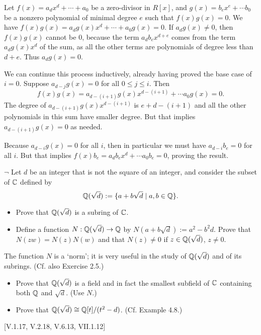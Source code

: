 \begin{solution}
	Let $f(x) = a_d x^d + \cdots + a_0$ be a zero-divisor in $R[x]$, and $g(x) = b_e x^e + \cdots b_0$ be a nonzero polynomial of minimal degree $e$ such that $f(x)g(x) = 0$. We have $f(x)g(x) = a_d g(x) x^d + \cdots + a_0 g(x) = 0$. If $a_d g(x) \neq 0$, then $f(x)g(x)$ cannot be $0$, because the term $a_d b_e x^{d+e}$ comes from the term $a_d g(x) x^d$ of the sum, as all the other terms are polynomials of degree less than $d+e$. Thus $a_d g(x) = 0$. 
	
	We can continue this process inductively, already having proved the base case of $i = 0$. Suppose $a_{d-j} g(x) = 0$ for all $0 \leq j \leq i$. Then
	\[
		f(x)g(x) = a_{d-(i+1)} g(x) x^{d-(i+1)} + \cdots a_0 g(x) = 0 \text{.}
	\]
	The degree of $a_{d-(i+1)} g(x) x^{d-(i+1)}$ is $e + d - (i+1)$ and all the other polynomials in this sum have smaller degree. But that implies $a_{d-(i+1)}g(x) = 0$ as needed.
	
	Because $a_{d-i} g(x) = 0$ for all $i$, then in particular we must have $a_{d-i} b_e = 0$ for all $i$. But that implies $f(x) b_e = a_d b_e x^d + \cdots a_0 b_e = 0$, proving the result.
\end{solution}

\begin{problem}
	$\neg$ Let $d$ be an integer that is not the square of an integer, and consider the subset of $\mathbb{C}$ defined by
	\[
		\mathbb{Q}(\sqrt{d}) := \{ a + b \sqrt{d} \mid a, b \in \mathbb{Q} \} \text{.}
	\]
	\begin{itemize}
		\item Prove that $\mathbb{Q}(\sqrt{d})$ is a subring of $\mathbb{C}$.
		\item Define a function $N: \mathbb{Q}(\sqrt{d}) \to \mathbb{Q}$ by $N(a + b \sqrt{d}) := a^2 - b^2d$. Prove that $N(zw) = N(z)N(w)$ and that $N(z) \neq 0$ if $z \in \mathbb{Q}(\sqrt{d})$, $z \neq 0$.
	\end{itemize}
	The function $N$ is a `norm'; it is very useful in the study of $\mathbb{Q}(\sqrt{d})$ and of its subrings. (Cf. also Exercise 2.5.)
	\begin{itemize}
		\item Prove that $\mathbb{Q}(\sqrt{d})$ is a field and in fact the smallest subfield of $\mathbb{C}$ containing both $\mathbb{Q}$ and $\sqrt{d}$. (Use $N$.)
		\item Prove that $\mathbb{Q}(\sqrt{d}) \cong \mathbb{Q}[t]/(t^2 - d)$. (Cf. Example 4.8.)
	\end{itemize}
	[V.1.17, V.2.18, V.6.13, VII.1.12]
\end{problem}

